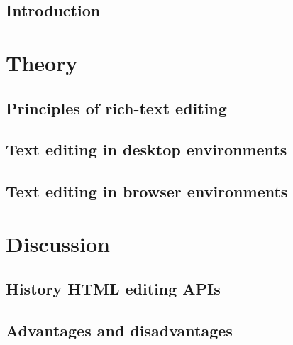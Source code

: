 \chapter{Introduction}



\part{Theory}
\label{part:theory}

\chapter{Principles of rich-text editing}



\chapter{Text editing in desktop environments}
\label{ch:desktop}



\chapter{Text editing in browser environments}
\label{ch:browser}






\part{Discussion}
\label{part:discussion}



\chapter{History HTML editing APIs}
\label{ch:editing_apis_history}






\chapter{Advantages and disadvantages}
\label{ch:editing_apis_adv_disadv}

